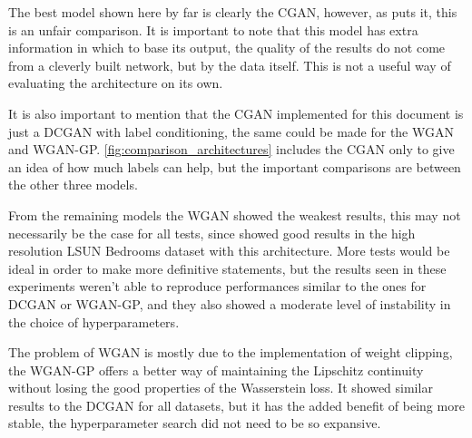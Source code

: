 The best model shown here by far is clearly the \gls{CGAN}, however, as \textcite{nipsGAN2017} puts it, this is an unfair comparison. It is important to note that this model has extra information in which to base its output, the quality of the results do not come from a cleverly built network, but by the data itself. This is not a useful way of evaluating the architecture on its own.

It is also important to mention that the \gls{CGAN} implemented for this document is just a \gls{DCGAN} with label conditioning, the same could be made for the \gls{WGAN} and \gls{WGAN-GP}. \autoref{fig:comparison_architectures} includes the \gls{CGAN} only to give an idea of how much labels can help, but the important comparisons are between the other three models.

From the remaining models the \gls{WGAN} showed the weakest results, this may not necessarily be the case for all tests, since \textcite{wasserstein2017} showed good results in the high resolution LSUN Bedrooms dataset with this architecture. More tests would be ideal in order to make more definitive statements, but the results seen in these experiments weren't able to reproduce performances similar to the ones for \gls{DCGAN} or \gls{WGAN-GP}, and they also showed a moderate level of instability in the choice of hyperparameters.

The problem of \gls{WGAN} is mostly due to the implementation of weight clipping, the \gls{WGAN-GP} offers a better way of maintaining the Lipschitz continuity without losing the good properties of the Wasserstein loss. It showed similar results to the \gls{DCGAN} for all datasets, but it has the added benefit of being more stable, the hyperparameter search did not need to be so expansive.
